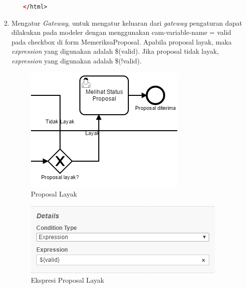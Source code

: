 \begin{enumerate}
\begin{enumerate}
\begin{lstlisting}[language=xml,basicstyle=\tiny,caption=MemeriksaProposal.html]
</html>

	\end{lstlisting}

\end{enumerate}

\item Mengatur \textit{Gateway}, untuk mengatur keluaran dari \textit{gateway} pengaturan dapat dilakukan pada modeler dengan menggunakan cam-variable-name = valid pada checkbox di form MemeriksaProposal. Apabila proposal layak, maka \textit{expression} yang digunakan adalah \$(valid). Jika proposal tidak layak, \textit{expression} yang digunakan adalah \$(!valid).
		\begin{figure}[H]
			\centering
			\includegraphics[scale=1]{Gambar/Bab-3/Kasus1/5layakgambar}
			\caption{Proposal Layak} 
			\label{fig:pengajuanproposal_layakgambar}
	\end{figure}
	\begin{figure}[H]
			\centering
			\includegraphics[scale=1]{Gambar/Bab-3/Kasus1/6layakkode}
			\caption{Ekspresi Proposal Layak} 
			\label{fig:pengajuanproposal_layakkode}
	\end{figure}
	

\end{enumerate}
